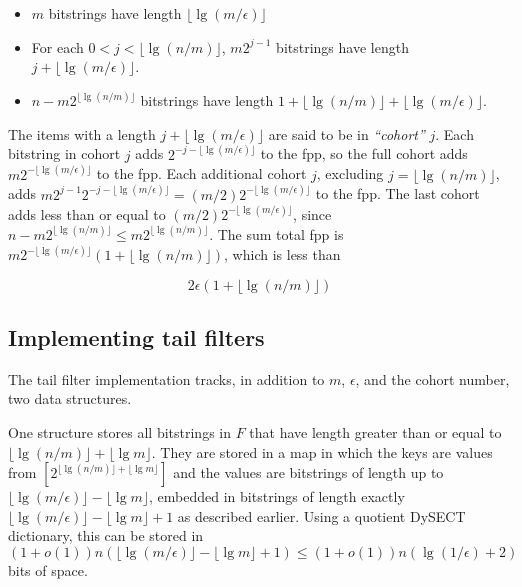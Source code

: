 \documentclass[11pt,letterpaper]{article}
\begin{document}
\begin {itemize}
\item $m$ bitstrings have length $\lfloor \lg (m / \epsilon) \rfloor$
\item For each $0 < j < \lfloor \lg (n/m) \rfloor $, $m2^{j-1}$ bitstrings have length $j + \lfloor \lg (m / \epsilon) \rfloor$.
\item $n - m2^{\lfloor \lg (n/m) \rfloor}$ bitstrings have length $1 + \lfloor \lg (n/m) \rfloor  + \lfloor \lg (m / \epsilon) \rfloor$.
\end {itemize}

The items with a length $j + \lfloor \lg (m / \epsilon) \rfloor$ are said to be in {\em ``cohort''} $j$.
Each bitstring in cohort $j$ adds $2^{- j - \lfloor \lg (m / \epsilon) \rfloor}$ to the fpp, so the full cohort adds $m2^{- \lfloor \lg (m / \epsilon) \rfloor}$ to the fpp.
Each additional cohort $j$, excluding $j = \lfloor \lg (n/m) \rfloor$, adds $m 2^{j-1} 2^{-j - \lfloor \lg (m / \epsilon) \rfloor} = (m/2) 2^{-\lfloor \lg (m / \epsilon) \rfloor}$ to the fpp.
The last cohort adds less than or equal to $(m/2) 2^{-\lfloor \lg (m / \epsilon) \rfloor}$, since $n - m 2^{\lfloor \lg (n/m) \rfloor} \leq m 2^{\lfloor \lg(n/m)\rfloor}$.
The sum total fpp is $m 2^{- \lfloor \lg (m / \epsilon) \rfloor} (1 + \lfloor \lg (n/m) \rfloor)$, which is less than

\begin{equation}
  2 \epsilon (1 + \lfloor \lg (n/m) \rfloor)
\end{equation}

\subsection{Implementing tail filters}

The tail filter implementation tracks, in addition to $m$, $\epsilon$, and the cohort number, two data structures.

One structure stores all bitstrings in $F$ that have length greater than or equal to $\lfloor \lg (n/m) \rfloor + \lfloor \lg m \rfloor$.
They are stored in a map in which the keys are values from $[2^{\lfloor \lg (n/m) \rfloor + \lfloor \lg m \rfloor}]$ and the values are bitstrings of length up to $\lfloor \lg (m/\epsilon) \rfloor - \lfloor \lg m \rfloor$, embedded in bitstrings of length exactly $\lfloor \lg (m/\epsilon) \rfloor - \lfloor \lg m \rfloor + 1$ as described earlier.
Using a quotient DySECT dictionary, this can be stored in $(1 + o(1))n(\lfloor \lg (m/\epsilon) \rfloor - \lfloor \lg m \rfloor + 1) \leq (1+o(1))n(\lg (1/\epsilon) + 2)$ bits of space.
\end{document}
